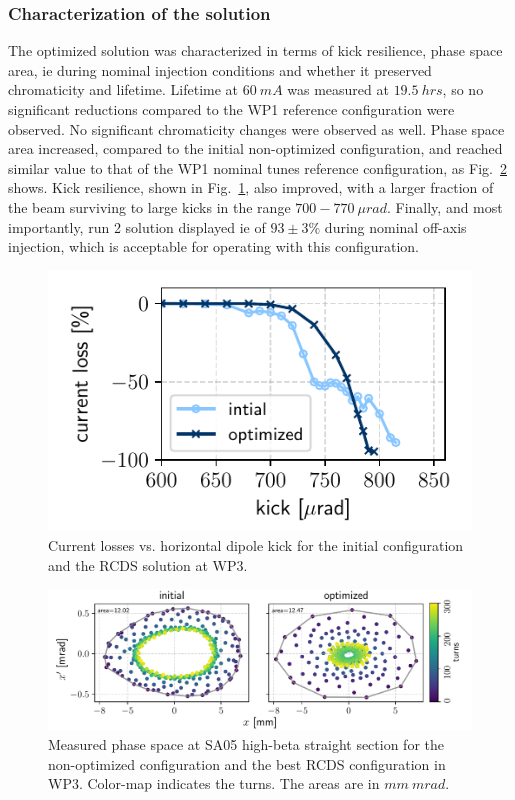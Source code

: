 \subsubsection{Characterization of the solution}
The optimized solution was characterized in terms of kick resilience, phase space area, \gls*{ie} during nominal injection conditions and whether it preserved chromaticity and lifetime.  Lifetime at $60~\unit{mA}$ was measured at $19.5~\unit{hrs}$, so no significant reductions compared to the \gls*{WP1} reference configuration were observed. No significant chromaticity changes were observed as well. Phase space area increased, compared to the initial non-optimized configuration, and reached similar value to that of the \gls*{WP1} nominal tunes reference configuration, as Fig.~\ref{fig:wp3_phase_space} shows. Kick resilience, shown in Fig.~\ref{fig:wp3_kick_res}, also improved, with a larger fraction of the beam surviving to large kicks in the range  $700-770~\unit{\mu rad}$. Finally, and most importantly, run 2 solution displayed \gls*{ie} of $93\pm3\%$ during nominal off-axis injection, which is acceptable for operating with this configuration.
\begin{figure}[tb]
    \centering
    \includegraphics[width=0.6\columnwidth]{Images/wp3_kick_resilience.pdf}
    \caption[Current losses vs. horizontal dipole kick for the initial configuration and the RCDS solution at WP3.]{Current losses vs. horizontal dipole kick for the initial configuration and the \gls*{RCDS} solution at \gls*{WP3}.}
    \label{fig:wp3_kick_res}
\end{figure}
\begin{figure}[htb]
    \centering
    \includegraphics[width=\textwidth]{Images/wp3_phase_space.pdf}
    \caption[Measured phase space at SA05 high-beta straight section for the non-optimized configuration and the best RCDS configuration in WP 3.]{Measured phase space at SA05 high-beta straight section for the non-optimized configuration and the best \gls*{RCDS} configuration in  \gls*{WP3}. Color-map indicates the turns. The areas are in $\unit{mm}~\unit{mrad}$.}
    \label{fig:wp3_phase_space}

\end{figure}
